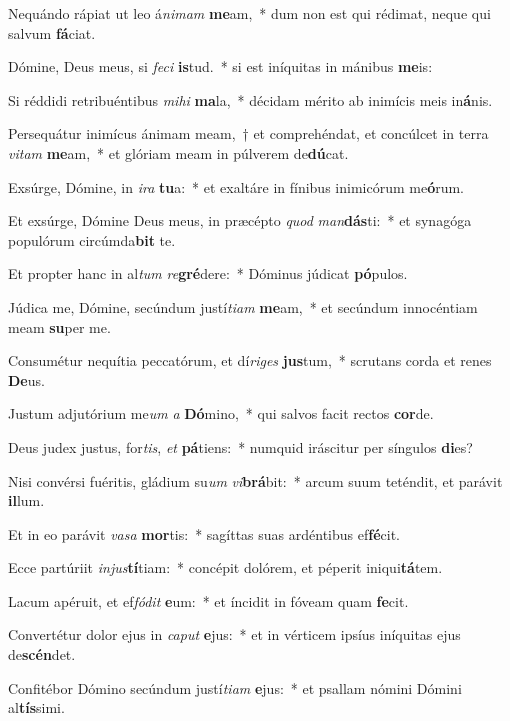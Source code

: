 \item Nequándo rápiat ut leo á\textit{ni}\textit{mam} \textbf{me}am,~* dum non est qui rédimat, neque qui salvum \textbf{fá}ciat.
\item Dómine, Deus meus, si \textit{fe}\textit{ci} \textbf{is}tud.~* si est iníquitas in mánibus \textbf{me}is:
\item Si réddidi retribuéntibus \textit{mi}\textit{hi} \textbf{ma}la,~* décidam mérito ab inimícis meis in\textbf{á}nis.
\item Persequátur inimícus ánimam meam,~† et comprehéndat, et concúlcet in terra \textit{vi}\textit{tam} \textbf{me}am,~* et glóriam meam in púlverem de\textbf{dú}cat.
\item Exsúrge, Dómine, in \textit{i}\textit{ra} \textbf{tu}a:~* et exaltáre in fínibus inimicórum me\textbf{ó}rum.
\item Et exsúrge, Dómine Deus meus, in præcépto \textit{quod} \textit{man}\textbf{dás}ti:~* et synagóga populórum circúmda\textbf{bit} te.
\item Et propter hanc in al\textit{tum} \textit{re}\textbf{gré}dere:~* Dóminus júdicat \textbf{pó}pulos.
\item Júdica me, Dómine, secúndum justí\textit{ti}\textit{am} \textbf{me}am,~* et secúndum innocéntiam meam \textbf{su}per me.
\item Consumétur nequítia peccatórum, et dí\textit{ri}\textit{ges} \textbf{jus}tum,~* scrutans corda et renes \textbf{De}us.
\item Justum adjutórium me\textit{um} \textit{a} \textbf{Dó}mino,~* qui salvos facit rectos \textbf{cor}de.
\item Deus judex justus, for\textit{tis}, \textit{et} \textbf{pá}tiens:~* numquid iráscitur per síngulos \textbf{di}es?
\item Nisi convérsi fuéritis, gládium su\textit{um} \textit{vi}\textbf{brá}bit:~* arcum suum teténdit, et parávit \textbf{il}lum.
\item Et in eo parávit \textit{va}\textit{sa} \textbf{mor}tis:~* sagíttas suas ardéntibus ef\textbf{fé}cit.
\item Ecce partúriit \textit{in}\textit{jus}\textbf{tí}tiam:~* concépit dolórem, et péperit iniqui\textbf{tá}tem.
\item Lacum apéruit, et ef\textit{fó}\textit{dit} \textbf{e}um:~* et íncidit in fóveam quam \textbf{fe}cit.
\item Convertétur dolor ejus in \textit{ca}\textit{put} \textbf{e}jus:~* et in vérticem ipsíus iníquitas ejus de\textbf{scén}det.
\item Confitébor Dómino secúndum justí\textit{ti}\textit{am} \textbf{e}jus:~* et psallam nómini Dómini al\textbf{tís}simi.
